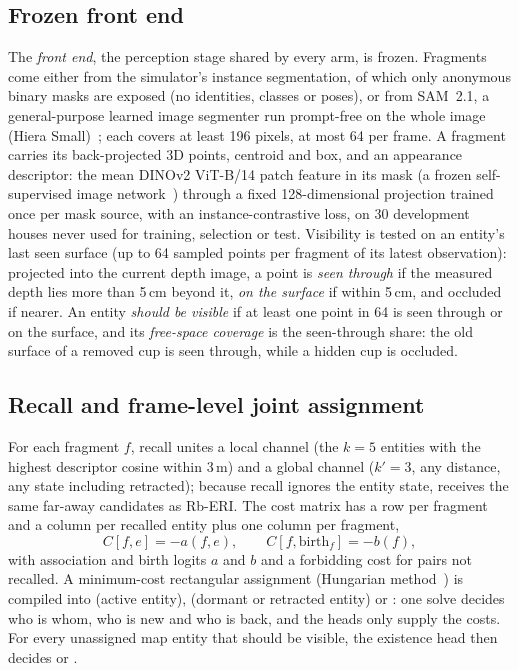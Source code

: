 \subsection{Frozen front end}
\label{sec:frontend}
The \emph{front end}, the perception stage shared by every arm, is frozen.
Fragments come either from the simulator's instance segmentation, of which only anonymous binary masks are exposed (no identities, classes or poses), or from SAM~2.1, a general-purpose learned image segmenter run prompt-free on the whole image (Hiera Small)~\cite{sam2_2025,sam21release}; each covers at least 196 pixels, at most 64 per frame.
A fragment carries its back-projected 3D points, centroid and box, and an appearance descriptor: the mean DINOv2 ViT-B/14 patch feature in its mask (a frozen self-supervised image network~\cite{dinov2_2024}) through a fixed 128-dimensional projection trained once per mask source, with an instance-contrastive loss, on 30 development houses never used for training, selection or test.
Visibility is tested on an entity's last seen surface (up to 64 sampled points per fragment of its latest observation): projected into the current depth image, a point is \emph{seen through} if the measured depth lies more than 5\,cm beyond it, \emph{on the surface} if within 5\,cm, and occluded if nearer.
An entity \emph{should be visible} if at least one point in 64 is seen through or on the surface, and its \emph{free-space coverage} is the seen-through share: the old surface of a removed cup is seen through, while a hidden cup is occluded.
\subsection{Recall and frame-level joint assignment}
For each fragment $f$, recall unites a local channel (the $k{=}5$ entities with the highest descriptor cosine within 3\,m) and a global channel ($k'{=}3$, any distance, any state including retracted); because recall ignores the entity state,  receives the same far-away candidates as Rb-ERI.
The cost matrix has a row per fragment and a column per recalled entity plus one  column per fragment,
\begin{equation}
C[f,e]=-a(f,e),\qquad C[f,\mathrm{birth}_f]=-b(f),
\label{eq:cost}
\end{equation}
with association and birth logits $a$ and $b$ and a forbidding cost for pairs not recalled.
A minimum-cost rectangular assignment (Hungarian method~\cite{kuhn1955}) is compiled into  (active entity),  (dormant or retracted entity) or : one solve decides who is whom, who is new and who is back, and the heads only supply the costs.
For every unassigned map entity that should be visible, the existence head then decides  or .

